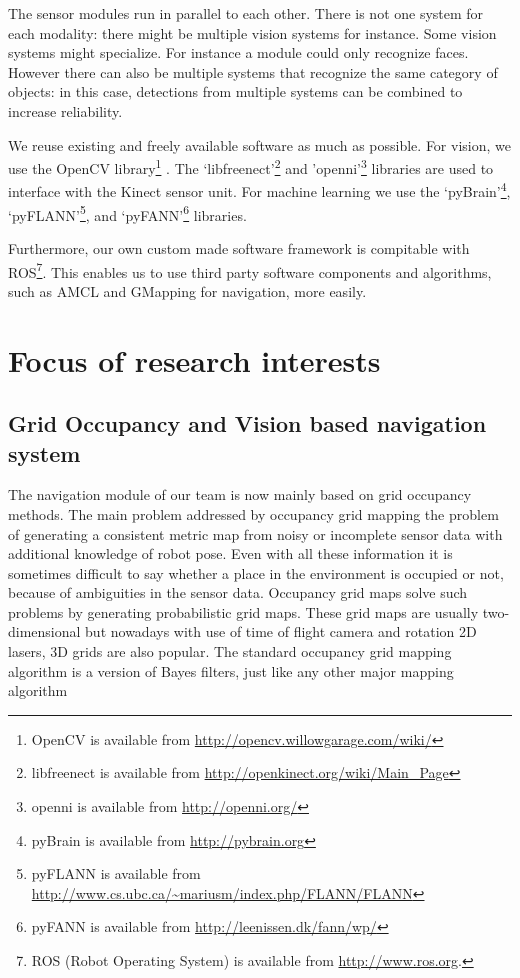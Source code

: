 \documentclass[runningheads,a4paper]{llncs}
\begin{document}
The sensor modules run in parallel to each other. 
There is not one system for each modality: there might be multiple vision systems for instance. 
Some vision systems might specialize. 
For instance a module could only recognize faces.
However there can also be multiple systems that recognize 
the same category of objects: in this case, detections from multiple systems can be combined to increase reliability. 

We reuse existing and freely available software as much as possible. 
For vision, we use the OpenCV library\footnote{OpenCV is available from \url{http://opencv.willowgarage.com/wiki/}} \cite{bradski2008}. 
The `libfreenect'\footnote{libfreenect is available from \url{http://openkinect.org/wiki/Main_Page}} and 'openni'\footnote{openni is available from \url{http://openni.org/}} libraries are used to interface with the Kinect sensor unit.
For machine learning we use the `pyBrain'\footnote{pyBrain is available from \url{http://pybrain.org}}, 
`pyFLANN'\footnote{pyFLANN is available from \url{http://www.cs.ubc.ca/~mariusm/index.php/FLANN/FLANN}}, 
and `pyFANN'\footnote{pyFANN is available from \url{http://leenissen.dk/fann/wp/}} libraries.

Furthermore, our own custom made software framework is compitable with ROS\footnote{ROS (Robot Operating System) is available from \url{http://www.ros.org}.}. This enables us to use third party software components and algorithms, such as AMCL\cite{fox2001kld} and GMapping\cite{grisetti2007improved} for navigation, more easily. 

\section{Focus of research interests}

\subsection{Grid Occupancy and Vision based navigation system}

The navigation module of our team is now mainly based on grid occupancy methods. 
The main problem addressed by occupancy grid mapping the problem of generating a consistent metric map from noisy or incomplete sensor data with additional knowledge of robot pose. 
Even with all these information it is sometimes difficult to say whether a place in the environment is occupied or not, because of ambiguities in the sensor data. 
Occupancy grid maps solve such problems by generating probabilistic grid maps. 
These grid maps are usually two-dimensional but nowadays with use of time of flight camera and rotation 2D lasers, 3D grids are also popular. 
The standard occupancy grid mapping algorithm is a version of Bayes filters, just like any other major mapping algorithm \cite{thrun2002robotic}\cite{elfes1989occupancy}
\end{document}
